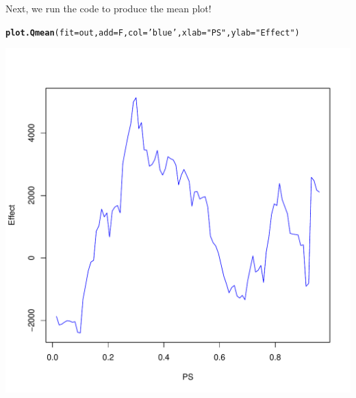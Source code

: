 \documentclass{article}\usepackage[]{graphicx}\usepackage[]{color}
\makeatletter
\def\maxwidth{ %
  \ifdim\Gin@nat@width>\linewidth
    \linewidth
  \else
    \Gin@nat@width
  \fi
}
\newcommand{\hlstr}[1]{\textcolor[rgb]{0.192,0.494,0.8}{#1}}%
\newcommand{\hlstd}[1]{\textcolor[rgb]{0.345,0.345,0.345}{#1}}%
\newcommand{\hlkwc}[1]{\textcolor[rgb]{0.333,0.667,0.333}{#1}}%
\newcommand{\hlkwd}[1]{\textcolor[rgb]{0.737,0.353,0.396}{\textbf{#1}}}%
\newenvironment{kframe}{%
 \def\at@end@of@kframe{}%
 \ifinner\ifhmode%
  \def\at@end@of@kframe{\end{minipage}}%
  \begin{minipage}{\columnwidth}%
 \fi\fi%
 \def\FrameCommand##1{\hskip\@totalleftmargin \hskip-\fboxsep
 \colorbox{shadecolor}{##1}\hskip-\fboxsep
     \hskip-\linewidth \hskip-\@totalleftmargin \hskip\columnwidth}%
 \MakeFramed {\advance\hsize-\width
   \@totalleftmargin\z@ \linewidth\hsize
   \@setminipage}}%
 {\par\unskip\endMakeFramed%
 \at@end@of@kframe}
\newenvironment{knitrout}{}{} %
\makeatother
\begin{document}
Next, we run the code to produce the mean plot!
\begin{knitrout}
\color{fgcolor}\begin{kframe}
\begin{alltt}
\hlkwd{plot.Qmean}\hlstd{(}\hlkwc{fit}\hlstd{=out ,} \hlkwc{add}\hlstd{=F ,} \hlkwc{col}\hlstd{=}\hlstr{'blue'} \hlstd{,} \hlkwc{xlab}\hlstd{=}\hlstr{"PS"} \hlstd{,} \hlkwc{ylab}\hlstd{=}\hlstr{"Effect"}\hlstd{)}
\end{alltt}
\end{kframe}

{\centering \includegraphics[width=\maxwidth]{figures/lalonde-meanplot-1} 

}



\end{knitrout}
\end{document}
